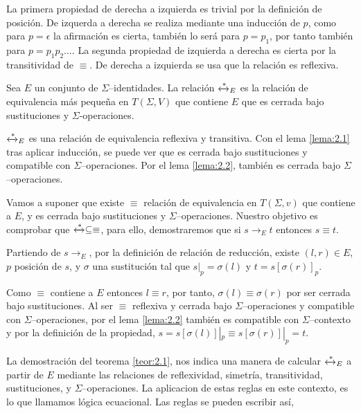 \begin{demo}
  La primera propiedad de derecha a izquierda es trivial por la
  definición de posición. De izquerda a derecha se realiza mediante
  una inducción de $p$, como para $p= \epsilon$ la afirmación es
  cierta, también lo será para $p=p_1$, por tanto también para
  $p=p_1 p_2 \dots$.  La segunda propiedad de izquierda a derecha es
  cierta por la transitividad de $\equiv$. De derecha a izquierda se
  usa que la relación es reflexiva.
\end{demo}

\begin{teor} \label{teor:2.1}
  Sea $E$ un conjunto de $\Sigma$--identidades. La relación
  $\xleftrightarrow{*}_E$ es la relación de equivalencia más pequeña en
  $T(\Sigma,V)$ que contiene $E$ que es cerrada bajo sustituciones y
  $\Sigma$-operaciones.
\end{teor}

\begin{demo}
  $\xleftrightarrow{*}_E$ es una relación de equivalencia reflexiva y
  transitiva. Con el lema \ref{lema:2.1} tras aplicar inducción, se puede
  ver que es cerrada bajo sustituciones y compatible con
  $\Sigma$--operaciones. Por el lema \ref{lema:2.2}, también es cerrada bajo
  $\Sigma$--operaciones.

  Vamos a suponer que existe $\equiv$ relación de equivalencia en
  $T(\Sigma,v)$ que contiene a $E$, y es cerrada bajo sustituciones y
  $\Sigma$--operaciones. Nuestro objetivo es comprobar que
  $\xleftrightarrow{*} \subseteq \equiv$, para ello, demostraremos que
  si $s \rightarrow_E t$ entonces $s \equiv t$.

  Partiendo de $s \rightarrow_E$, por la definición de relación de
  reducción, existe $(l,r) \in E$, $p$ posición de $s$, y $\sigma$ una
  sustitución tal que $s|_p = \sigma(l)$ y $t= s [\sigma(r)]_p$. 

  Como $\equiv$ contiene a $E$ entonces $l \equiv r$, por tanto,
  $\sigma(l) \equiv \sigma(r)$ por ser cerrada bajo sustituciones.  Al
  ser $\equiv$ reflexiva y cerrada bajo $\Sigma$--operaciones y
  compatible con $\Sigma$--operaciones, por el lema \ref{lema:2.2} también
  es compatible con $\Sigma$--contexto y por la definición de la
  propiedad, $s = s[\sigma(l)]|_p \equiv s[\sigma(r)]|_p = t$.
\end{demo}

La demostración del teorema \ref{teor:2.1}, nos indica una manera de
calcular $\xleftrightarrow{*}_E$ a partir de $E$ mediante las
relaciones de reflexividad, simetría, transitividad, sustituciones,
y $\Sigma$--operaciones. La aplicacion de estas reglas en este
contexto, es lo que llamamos lógica ecuacional. Las reglas se pueden escribir así,

